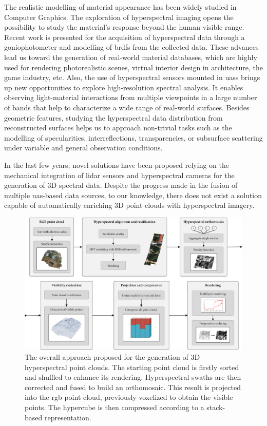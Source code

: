 The realistic modelling of material appearance has been widely studied in Computer Graphics. The exploration of hyperspectral imaging opens the possibility to study the material's response beyond the human visible range. Recent work is presented for the acquisition of hyperspectral data through a goniophotometer and modelling of \acrshort{brdf}s from the collected data. These advances lead us toward the generation of real-world material databases, which are highly used for rendering photorealistic scenes, virtual interior design in architecture, the game industry, etc. Also, the use of hyperspectral sensors mounted in \acrshort{uas}s brings up new opportunities to explore high-resolution spectral analysis. It enables observing light-material interactions from multiple viewpoints in a large number of bands that help to characterize a wide range of real-world surfaces. Besides geometric features, studying the hyperspectral data distribution from reconstructed surfaces helps us to approach non-trivial tasks such as the modelling of specularities, interreflections, transparencies, or subsurface scattering under variable and general observation conditions. 

In the last few years, novel solutions have been proposed relying on the mechanical integration of \acrshort{lidar} sensors and hyperspectral cameras for the generation of 3D spectral data. Despite the progress made in the fusion of multiple \acrshort{uas}-based data sources, to our knowledge, there does not exist a solution capable of automatically enriching 3D point clouds with hyperspectral imagery. 

\begin{figure}[bt]
    \centering
    \includegraphics[width=\linewidth]{figs/hyper_point_cloud/overview.png}
	\caption{The overall approach proposed for the generation of 3D hyperspectral point clouds. The starting point cloud is firstly sorted and shuffled to enhance its rendering. Hyperspectral swaths are then corrected and fused to build an orthomosaic. This result is projected into the \acrshort{rgb} point cloud, previously voxelized to obtain the visible points. The hypercube is then compressed according to a stack-based representation. }
	\label{fig:hyper_summary}
\end{figure}

